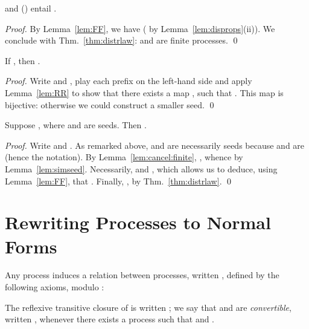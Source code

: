 \documentclass{llncs}
\begin{document}
\begin{lem}\label{lem:RR}
   and  () entail .
\end{lem}
\begin{proof}
  By Lemma~\ref{lem:FF}, we have  ( by
  Lemma~\ref{lem:disprops}(ii)).  We conclude with
  Thm.~\ref{thm:distrlaw}:  and  are finite processes.  \qed
\end{proof}

\begin{lem}\label{lem:simseed}
  If , then .
\end{lem}
\begin{proof}
  Write  and , play each prefix on the left-hand side and apply
  Lemma~\ref{lem:RR} to show that there exists a map , such that
  . This map is
  bijective: otherwise we could construct a smaller seed.
\qed
\end{proof}

\begin{prop}\label{prop:compare:seeds}
  Suppose , where  and  are seeds. Then .
\end{prop}
\begin{proof}
  Write  and . As remarked above, 
  and  are necessarily seeds because  and  are (hence the
  notation). By Lemma~\ref{lem:cancel:finite}, , whence
   by Lemma~\ref{lem:simseed}.
Necessarily,  and , which allows us to deduce,
  using Lemma~\ref{lem:FF}, that . Finally, , by
  Thm.~\ref{thm:distrlaw}.
\qed
\end{proof}












\section{Rewriting Processes to Normal Forms}
\label{sec:rwt}



\begin{defi}\label{def:rewr:conv}
  Any process  induces a relation between processes, written
  , defined by the following axioms, modulo :
The reflexive transitive closure of  is written ;
we say that  and  are \emph{convertible}, written ,
whenever there exists a process  such that  and
.
\end{defi}
\end{document}
